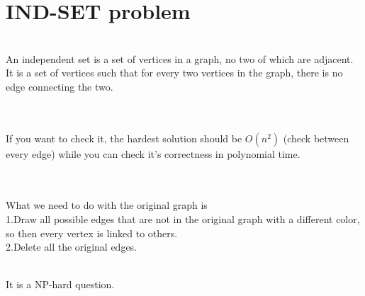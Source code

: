 \documentclass{article}
\begin{document}
\section{IND-SET problem}
\\An independent set is a set of vertices in a graph, no two of which are adjacent. It is a set of vertices such that for every two vertices in the graph, there is no edge connecting the two.
\\\\ 
\\If you want to check it, the hardest solution should be $O(n^2)$ (check between every edge) while you can check it's correctness in polynomial time. 
\\\\
\\What we need to do with the original graph is 
\\1.Draw all possible edges that are not in the original graph with a different color, so then every vertex is linked to others.
\\2.Delete all the original edges.
\\\\
 It is a NP-hard question.
\\\\
\end{document}

